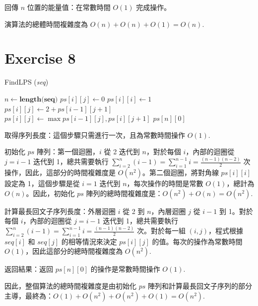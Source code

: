 \documentclass[8pt, fleqn]{report}
\begin{document}
回傳 \(n\) 位置的能量值：在常數時間 \(O(1)\) 完成操作。

演算法的總體時間複雜度為 \(O(n) + O(n) + O(1) = O(n)\).

\section*{Exercise 8}
\begin{algorithm}[H]
    \caption{FindLPS (\textit{seq})}
    \label{alg:FindLPS}
    \begin{algorithmic}[1]
        \State $n \gets \textbf{length(seq)}$ 
        \State $ps[i][j] \gets 0$ 
        \EndFor
        \EndFor
        \State $ps[i][i] \gets 1$ 
        \EndFor
        \State $ps[i][j] \gets 2 + ps[i-1][j+1]$ 
        \Else
        \State $ps[i][j] \gets \max{ps[i-1][j], ps[i][j+1]}$ 
        \EndIf
        \EndFor
        \EndFor
        \State \Return $ps[n][0]$ 
    \end{algorithmic}
\end{algorithm}

取得序列長度：這個步驟只需進行一次，且為常數時間操作 \(O(1)\).

初始化 \(ps\) 陣列：第一個迴圈，\(i\) 從 2 迭代到 \(n\)，對於每個 \(i\)，內部的迴圈從 \(j = i-1\) 迭代到 1，總共需要執行 \(\sum_{i=2}^{n} (i-1) = \sum_{i=1}^{n-1} i = \frac{(n-1)(n-2)}{2}\) 次操作，因此，這部分的時間複雜度是 \(O(n^2)\)。第二個迴圈，將對角線 \(ps[i][i]\) 設定為 1，這個步驟是從 \(i = 1\) 迭代到 \(n\)，每次操作的時間是常數 \(O(1)\)，總計為 \(O(n)\)。因此，初始化 \(ps\) 陣列的總時間複雜度是：\(O(n^2) + O(n) = O(n^2)\).

計算最長回文子序列長度：外層迴圈 \(i\) 從 2 到 \(n\)，內層迴圈 \(j\) 從 \(i-1\) 到 1。對於每個 \(i\)，內部的迴圈從 \(j = i-1\) 迭代到 1，總共需要執行 \(\sum_{i=2}^{n} (i-1) = \sum_{i=1}^{n-1} i = \frac{(n-1)(n-2)}{2}\) 次。對於每一組 \((i, j)\)，程式根據 \(seq[i]\) 和 \(seq[j]\) 的相等情況來決定 \(ps[i][j]\) 的值。每次的操作為常數時間 \(O(1)\)，因此這部分的總時間複雜度為 \(O(n^2)\).

返回結果：返回 \(ps[n][0]\) 的操作是常數時間操作 \(O(1)\).

因此，整個算法的總時間複雜度是由初始化 \(ps\) 陣列和計算最長回文子序列的部分主導，最終為：\(O(1) + O(n^2) + O(n^2) + O(1) = O(n^2)\).
\end{document}
